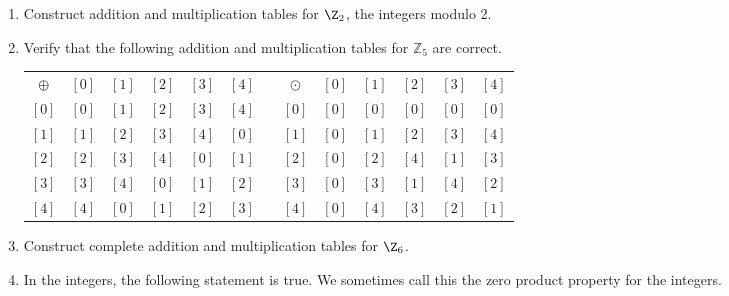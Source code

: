 %
\begin{prog}\label{prog:modulararithmetic5-6} \hfill
\begin{enumerate}
  \item Construct addition and multiplication tables for $\Z_2$, the integers modulo 2.
\item Verify that the following addition and multiplication tables for  $\mathbb{Z}_5 $  are correct.
\label{exam:sec74-tables}

\begin{center}
\begin{tabular}{ c | c  c  c  c  c p{0.5in} c | c  c  c  c  c}
$\oplus$ & $[ 0 ]$ & $[ 1 ]$ & $[ 2 ]$ & $[ 3 ]$ & 
$[ 4 ]$ &  & $\odot$ & $[ 0 ]$ & $[ 1 ]$ & $[ 2 ]$ & $[ 3 ]$ & $[ 4 ]$ \\ \cline{1-6} \cline{8-13}

$[ 0 ]$ & $[ 0 ]$ & $[ 1 ]$ & $[ 2 ]$ & 
$[ 3 ]$ & $[ 4 ]$ &  & $[ 0 ]$ & $[ 0 ]$ & 
$[ 0 ]$ & $[ 0 ]$ & $[ 0 ]$ & $[ 0 ]$ 
\\ %

$[ 1 ]$ & $[ 1 ]$ & $[ 2 ]$ & $[ 3 ]$ & 
$[ 4 ]$ & $[ 0 ]$ &  & $[ 1 ]$ & $[ 0 ]$ & 
$[ 1 ]$ & $[ 2 ]$ & $[ 3 ]$ & $[ 4 ]$ 
\\ %

$[ 2 ]$ & $[ 2 ]$ & $[ 3 ]$ & $[ 4 ]$ & 
$[ 0 ]$ & $[ 1 ]$ &  & $[ 2 ]$ & $[ 0 ]$ & 
$[ 2 ]$ & $[ 4 ]$ & $[ 1 ]$ & $[ 3 ]$ 
\\ %

$[ 3 ]$ & $[ 3 ]$ & $[ 4 ]$ & $[ 0 ]$ & 
$[ 1 ]$ & $[ 2 ]$ &  & $[ 3 ]$ & $[ 0 ]$ & 
$[ 3 ]$ & $[ 1 ]$ & $[ 4 ]$ & $[ 2 ]$ 
\\ %

$[ 4 ]$ & $[ 4 ]$ & $[ 0 ]$ & $[ 1 ]$ & 
$[ 2 ]$ & $[ 3 ]$ &  & $[ 4 ]$ & $[ 0 ]$ & 
$[ 4 ]$ & $[ 3 ]$ & $[ 2 ]$ & $[ 1 ]$ 
\\ %

\end{tabular}
\end{center}

\item Construct complete addition and multiplication tables for  $\Z_6 $.

\item In the integers, the following statement is true.  We sometimes call this the zero product property for the integers.


\end{enumerate}
\end{prog}
